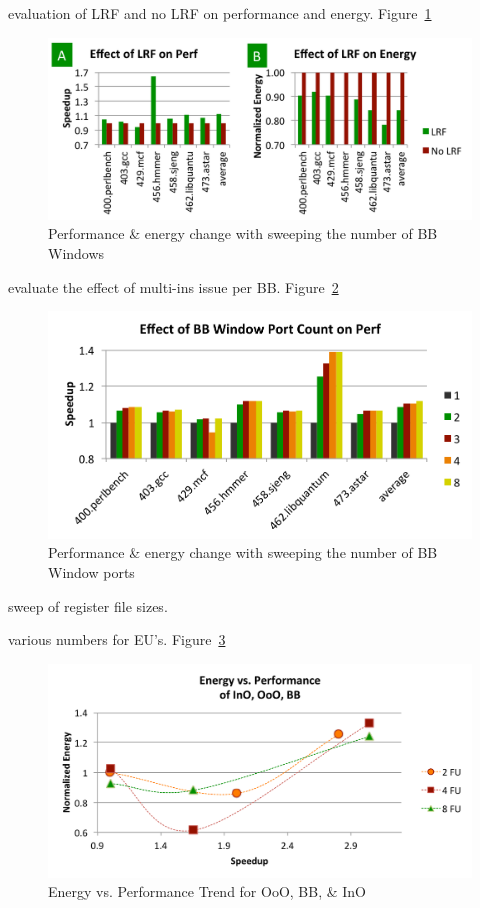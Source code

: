 evaluation of LRF and no LRF on performance and energy. Figure~\ref{fig:lrf_effect}
\begin{figure}[h]
	\centering
	\includegraphics[width=1.0\columnwidth]{result/lrf_effect.pdf} 
    \caption{Performance \& energy change with sweeping the number of BB Windows}
	\label{fig:lrf_effect}
\end{figure}

evaluate the effect of multi-ins issue per BB. Figure~\ref{fig:bbWin_port}
\begin{figure}[h]
	\centering
	\includegraphics[width=1.0\columnwidth]{result/bbWin_port.pdf} 
    \caption{Performance \& energy change with sweeping the number of BB Window
    ports}
	\label{fig:bbWin_port}
\end{figure}

sweep of register file sizes. 

various numbers for EU's. Figure~\ref{fig:ep}
\begin{figure}[h]
	\centering
	\includegraphics[width=1.0\columnwidth]{result/ep.pdf} 
    \caption{Energy vs. Performance Trend for OoO, BB, \& InO}
	\label{fig:ep}
\end{figure}


